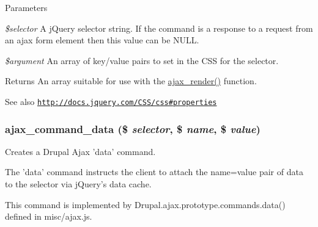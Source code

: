 \begin{DoxyParams}{Parameters}
\item[{\em \$selector}]A jQuery selector string. If the command is a response to a request from an ajax form element then this value can be NULL. \item[{\em \$argument}]An array of key/value pairs to set in the CSS for the selector.\end{DoxyParams}
\begin{DoxyReturn}{Returns}
An array suitable for use with the \hyperlink{group__ajax_ga241c2426bdde049c55b05b7bf5d714a2}{ajax\_\-render()} function.
\end{DoxyReturn}
\begin{DoxySeeAlso}{See also}
\href{http://docs.jquery.com/CSS/css#properties}{\tt http://docs.jquery.com/CSS/css\#properties} 
\end{DoxySeeAlso}
\hypertarget{group__ajax__commands_gad092aa7cd3258f6ed7f18f9f2f8cb8db}{
\subsubsection[{ajax\_\-command\_\-data}]{\setlength{\rightskip}{0pt plus 5cm}ajax\_\-command\_\-data (\$ {\em selector}, \/  \$ {\em name}, \/  \$ {\em value})}}
\label{group__ajax__commands_gad092aa7cd3258f6ed7f18f9f2f8cb8db}
Creates a Drupal Ajax 'data' command.

The 'data' command instructs the client to attach the name=value pair of data to the selector via jQuery's data cache.

This command is implemented by Drupal.ajax.prototype.commands.data() defined in misc/ajax.js.


